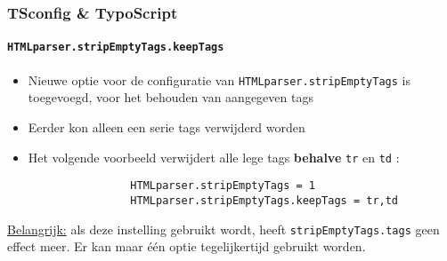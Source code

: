 \begin{frame}[fragile]
	\frametitle{TSconfig \& TypoScript}
	\framesubtitle{\texttt{HTMLparser.stripEmptyTags.keepTags}}

	\lstset{basicstyle=\tiny\ttfamily}

	\begin{itemize}

		\item Nieuwe optie voor de configuratie van \texttt{HTMLparser.stripEmptyTags} is toegevoegd,
			voor het behouden van aangegeven tags
		\item Eerder kon alleen een serie tags verwijderd worden
		\item Het volgende voorbeeld verwijdert alle lege tags \textbf{behalve} \texttt{tr} en \texttt{td} :

			\begin{lstlisting}
				HTMLparser.stripEmptyTags = 1
				HTMLparser.stripEmptyTags.keepTags = tr,td
			\end{lstlisting}

	\end{itemize}

	\underline{Belangrijk:} als deze instelling gebruikt wordt, heeft \texttt{stripEmptyTags.tags}
		geen effect meer. Er kan maar één optie tegelijkertijd gebruikt worden.

\end{frame}

